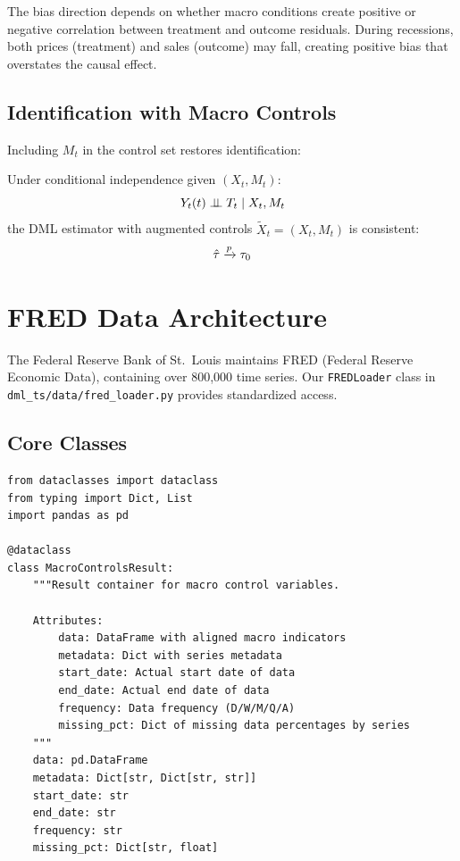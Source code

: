\begin{remark}
The bias direction depends on whether macro conditions create positive or negative correlation between treatment and outcome residuals. During recessions, both prices (treatment) and sales (outcome) may fall, creating positive bias that overstates the causal effect.
\end{remark}

\subsection{Identification with Macro Controls}

Including $M_t$ in the control set restores identification:

\begin{corollary}
\label{cor:macro_dml}
Under conditional independence given $(X_t, M_t)$:
\begin{equation}
Y_t(t) \perp\!\!\!\perp T_t \mid X_t, M_t
\end{equation}
the DML estimator with augmented controls $\tilde{X}_t = (X_t, M_t)$ is consistent:
\begin{equation}
\hat{\tau} \xrightarrow{p} \tau_0
\end{equation}
\end{corollary}

\section{FRED Data Architecture}\label{sec:fred_architecture}

The Federal Reserve Bank of St.\ Louis maintains FRED (Federal Reserve Economic Data), containing over 800,000 time series. Our \texttt{FREDLoader} class in \texttt{dml\_ts/data/fred\_loader.py} provides standardized access.

\subsection{Core Classes}

\begin{verbatim}
from dataclasses import dataclass
from typing import Dict, List
import pandas as pd

@dataclass
class MacroControlsResult:
    """Result container for macro control variables.

    Attributes:
        data: DataFrame with aligned macro indicators
        metadata: Dict with series metadata
        start_date: Actual start date of data
        end_date: Actual end date of data
        frequency: Data frequency (D/W/M/Q/A)
        missing_pct: Dict of missing data percentages by series
    """
    data: pd.DataFrame
    metadata: Dict[str, Dict[str, str]]
    start_date: str
    end_date: str
    frequency: str
    missing_pct: Dict[str, float]
\end{verbatim}

